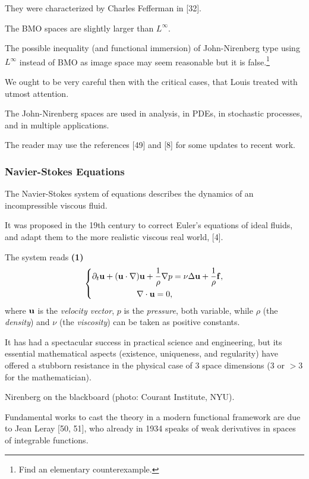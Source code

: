 \documentclass{article}
\begin{document}
They were characterized by Charles Fefferman in [32].

The BMO spaces are slightly larger than $L^\infty$.

The possible inequality (and functional immersion) of John-Nirenberg type using $L^\infty$ instead of BMO as image space may seem reasonable but it is false.\footnote{Find an elementary counterexample.}

We ought to be very careful then with the critical cases, that Louis treated with utmost attention.

The John-Nirenberg spaces are used in analysis, in PDEs, in stochastic processes, and in multiple applications.

The reader may use the references [49] and [8] for some updates to recent work.

\subsubsection{Navier-Stokes Equations}
The Navier-Stokes system of equations describes the dynamics of an incompressible viscous fluid.

It was proposed in the 19th century to correct Euler's equations of ideal fluids, and adapt them to the more realistic viscous real world, [4].

The system reads \textbf{(1)}
\begin{equation*}
	\left\{\begin{split}
		\partial_t{\bf u} + ({\bf u}\cdot\nabla){\bf u} + \frac{1}{\rho}\nabla p &= \nu\Delta{\bf u} + \frac{1}{\rho}{\bf f},\\
		\nabla\cdot{\bf u} = 0,
	\end{split}\right.
\end{equation*}
where ${\bf u}$ is the \textit{velocity vector}, $p$ is the \textit{pressure}, both variable, while $\rho$ (the \textit{density}) and $\nu$ (the \textit{viscosity}) can be taken as positive constants.

It has had a spectacular success in practical science and engineering, but its essential mathematical aspects (existence, uniqueness, and regularity) have offered a stubborn resistance in the physical case of 3 space dimensions (3 or $> 3$ for the mathematician).

\textsf{Nirenberg on the blackboard (photo: Courant Institute, NYU).}

%
Fundamental works to cast the theory in a modern functional framework are due to Jean Leray [50, 51], who already in 1934 speaks of weak derivatives in spaces of integrable functions.
\end{document}

